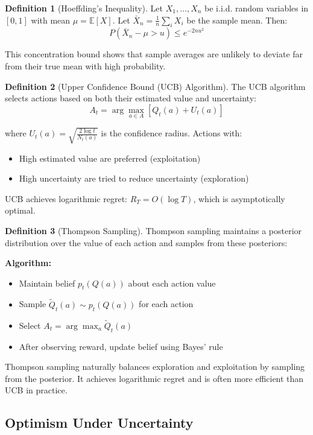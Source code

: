 \documentclass[12pt,a4paper]{article}
\theoremstyle{definition}
\newtheorem{definition}{Definition}[section]
\begin{document}
\begin{definition}[Hoeffding's Inequality]
Let $X_1, \ldots, X_n$ be i.i.d. random variables in $[0, 1]$ with mean $\mu = \mathbb{E}[X]$. Let $\bar{X}_n = \frac{1}{n} \sum_i X_i$ be the sample mean. Then:
\[
P(\bar{X}_n - \mu > u) \leq e^{-2nu^2}
\]

This concentration bound shows that sample averages are unlikely to deviate far from their true mean with high probability.
\end{definition}

\begin{definition}[Upper Confidence Bound (UCB) Algorithm]
The UCB algorithm selects actions based on both their estimated value and uncertainty:
\[
A_t = \arg\max_{a \in A} \left[ Q_t(a) + U_t(a) \right]
\]

where $U_t(a) = \sqrt{\frac{2 \log t}{N_t(a)}}$ is the confidence radius. Actions with:
\begin{itemize}
    \item High estimated value are preferred (exploitation)
    \item High uncertainty are tried to reduce uncertainty (exploration)
\end{itemize}

UCB achieves logarithmic regret: $R_T = O(\log T)$, which is asymptotically optimal.
\end{definition}

\begin{definition}[Thompson Sampling]
Thompson sampling maintains a posterior distribution over the value of each action and samples from these posteriors:

\textbf{Algorithm:}
\begin{itemize}
    \item Maintain belief $p_t(Q(a))$ about each action value
    \item Sample $\tilde{Q}_t(a) \sim p_t(Q(a))$ for each action
    \item Select $A_t = \arg\max_a \tilde{Q}_t(a)$
    \item After observing reward, update belief using Bayes' rule
\end{itemize}

Thompson sampling naturally balances exploration and exploitation by sampling from the posterior. It achieves logarithmic regret and is often more efficient than UCB in practice.
\end{definition}

\subsection{Optimism Under Uncertainty}
\end{document}

